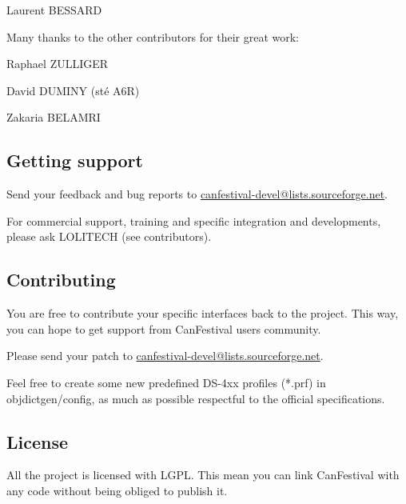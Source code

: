 \documentclass[a4paper,12pt]{book}
\begin{document}
{\mdseries
   Laurent BESSARD}


\bigskip

Many thanks to the other contributors for their great work:

\textmd{   }Raphael ZULLIGER

\textmd{   }David DUMINY (st\'e A6R)

\textmd{   }Zakaria BELAMRI

\subsection{Getting support}
Send your feedback and bug reports to
\href{mailto:canfestival-devel@lists.sourceforge.net}{canfestival{}-devel@lists.sourceforge.net}.

For commercial support, \space training and specific integration and
developments, please ask LOLITECH (see contributors).

\subsection{Contributing}
You are free to contribute your specific interfaces back to the project.
This way, you can hope to get support from CanFestival users community.

Please send your patch to
\href{mailto:canfestival-devel@lists.sourceforge.net}{canfestival{}-devel@lists.sourceforge.net}.

Feel free to create some new predefined DS{}-4xx profiles (*.prf) in
objdictgen/config, as much as possible respectful to the official
specifications.

\subsection{License}
All the project is licensed with LGPL. This mean you can link
CanFestival with any code without being obliged to publish it.
\end{document}
